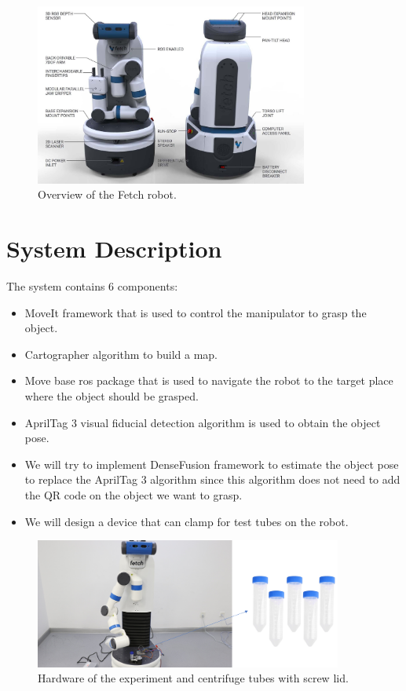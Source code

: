 \documentclass[12pt,draftclsnofoot,onecolumn]{IEEEtran}
\begin{document}
    \begin{figure}[htbp] %
		\centering
		\includegraphics[width=0.8\textwidth]{img/FetchRobot.jpg}
		\caption{
			Overview of the Fetch robot.
		}
		\label{overview}
	\end{figure}
	
	
	\section{System Description}
	The system contains 6 components:
	\begin{itemize}
		\item  MoveIt framework that is used to control the manipulator to grasp the object.
		\item Cartographer algorithm to build a map.
		\item Move base ros package that is used to navigate the robot to the target place where the object should be grasped.
		\item AprilTag 3 visual fiducial detection algorithm is used to obtain the object pose.
		\item We will try to implement DenseFusion framework to estimate the object pose to replace the AprilTag 3 algorithm since this algorithm does not need to add the QR code on the object we want to grasp.
		\item We will design a device that can clamp for test tubes on the robot.
	\end{itemize}
	
	\begin{figure}[htbp] %
		\centering
		\includegraphics[width=0.9\textwidth]{img/fetch.png}
		\caption{
			Hardware of the experiment and centrifuge tubes with screw lid.
		}
		\label{tube}
	\end{figure}
	
\end{document}
